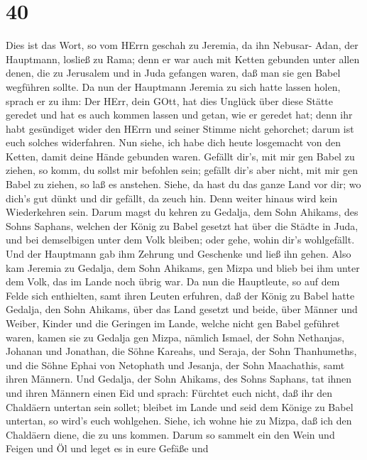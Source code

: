 \hypertarget{section-39}{%
\section{40}\label{section-39}}

 Dies ist das Wort, so vom HErrn geschah zu Jeremia, da ihn
Nebusar- Adan, der Hauptmann, losließ zu Rama; denn er war auch mit
Ketten gebunden unter allen denen, die zu Jerusalem und in Juda gefangen
waren, daß man sie gen Babel wegführen sollte.  Da nun der
Hauptmann Jeremia zu sich hatte lassen holen, sprach er zu ihm: Der
HErr, dein GOtt, hat dies Unglück über diese Stätte geredet 
und hat es auch kommen lassen und getan, wie er geredet hat; denn ihr
habt gesündiget wider den HErrn und seiner Stimme nicht gehorchet; darum
ist euch solches widerfahren.  Nun siehe, ich habe dich
heute losgemacht von den Ketten, damit deine Hände gebunden waren.
Gefällt dir's, mit mir gen Babel zu ziehen, so komm, du sollst mir
befohlen sein; gefällt dir's aber nicht, mit mir gen Babel zu ziehen, so
laß es anstehen. Siehe, da hast du das ganze Land vor dir; wo dich's gut
dünkt und dir gefällt, da zeuch hin.  Denn weiter hinaus
wird kein Wiederkehren sein. Darum magst du kehren zu Gedalja, dem Sohn
Ahikams, des Sohns Saphans, welchen der König zu Babel gesetzt hat über
die Städte in Juda, und bei demselbigen unter dem Volk bleiben; oder
gehe, wohin dir's wohlgefällt. Und der Hauptmann gab ihm Zehrung und
Geschenke und ließ ihn gehen.  Also kam Jeremia zu Gedalja,
dem Sohn Ahikams, gen Mizpa und blieb bei ihm unter dem Volk, das im
Lande noch übrig war.  Da nun die Hauptleute, so auf dem
Felde sich enthielten, samt ihren Leuten erfuhren, daß der König zu
Babel hatte Gedalja, den Sohn Ahikams, über das Land gesetzt und beide,
über Männer und Weiber, Kinder und die Geringen im Lande, welche nicht
gen Babel geführet waren,  kamen sie zu Gedalja gen Mizpa,
nämlich Ismael, der Sohn Nethanjas, Johanan und Jonathan, die Söhne
Kareahs, und Seraja, der Sohn Thanhumeths, und die Söhne Ephai von
Netophath und Jesanja, der Sohn Maachathis, samt ihren Männern.
 Und Gedalja, der Sohn Ahikams, des Sohns Saphans, tat ihnen
und ihren Männern einen Eid und sprach: Fürchtet euch nicht, daß ihr den
Chaldäern untertan sein sollet; bleibet im Lande und seid dem Könige zu
Babel untertan, so wird's euch wohlgehen.  Siehe, ich wohne
hie zu Mizpa, daß ich den Chaldäern diene, die zu uns kommen. Darum so
sammelt ein den Wein und Feigen und Öl und leget es in eure Gefäße und

